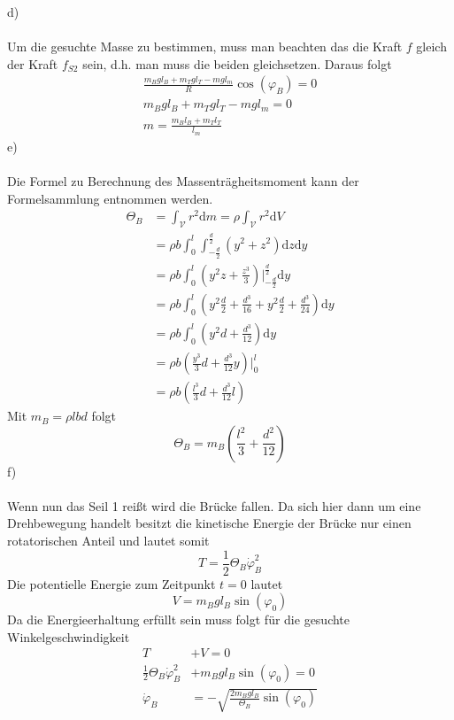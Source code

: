 d)\\ \\
Um die gesuchte Masse zu bestimmen, muss man beachten das die Kraft $f$ gleich der Kraft $f_{S2}$ sein, d.h. man muss die beiden gleichsetzen. Daraus folgt
\begin{align*}
	\frac{m_Bgl_B + m_Tgl_T - mgl_m}{R}\cos(\varphi_B) = 0 \\
	m_Bgl_B + m_Tgl_T - mgl_m = 0 \\
	m = \frac{m_Bl_B + m_Tl_T}{l_m}
\end{align*}
\newpage
\noindent
e)\\ \\
Die Formel zu Berechnung des Massenträgheitsmoment kann der Formelsammlung entnommen werden.
\begin{align*}
	\varTheta_B &= \int_{\mathcal{V}}r^2\text{d}m = \rho \int_{\mathcal{V}}r^2\text{d}V \\
	&= \rho b \int_{0}^{l}\int_{-\frac{d}{2}}^{\frac{d}{2}}(y^2 + z^2)\text{d}z\text{d}y \\
	&= \rho b \int_{0}^{l}\left(y^2z + \frac{z^3}{3}\right)\biggl|^{\frac{d}{2}}_{-\frac{d}{2}}\text{d}y \\
	&= \rho b \int_{0}^{l}\left(y^2\frac{d}{2} + \frac{d^3}{16} + y^2\frac{d}{2} + \frac{d^3}{24}\right)\text{d}y \\
	&= \rho b \int_{0}^{l}\left(y^2d + \frac{d^3}{12}\right)\text{d}y \\
	&= \rho b \left(\frac{y^3}{3}d + \frac{d^3}{12}y\right)\biggl|^{l}_0 \\
	&= \rho b \left(\frac{l^3}{3}d + \frac{d^3}{12}l\right)
\end{align*}
Mit $m_B = \rho lbd$ folgt
\[
	\varTheta_B = m_B\left(\frac{l^2}{3} + \frac{d^2}{12}\right)
\]
f)\\ \\
Wenn nun das Seil 1 reißt wird die Brücke fallen. Da sich hier dann um eine Drehbewegung handelt besitzt die kinetische Energie der Brücke nur einen rotatorischen Anteil und lautet somit
\[
	T = \frac{1}{2}\varTheta_B\dot{\varphi}^2_B
\]
Die potentielle Energie zum Zeitpunkt $t = 0$ lautet
\[
	V = m_B g l_B \sin(\varphi_0)
\]
Da die Energieerhaltung erfüllt sein muss folgt für die gesuchte Winkelgeschwindigkeit
\begin{align*}
	T &+ V = 0 \\
	\frac{1}{2}\varTheta_B\dot{\varphi}_B^2 &+ m_B g l_B \sin(\varphi_0) = 0 \\
	\dot{\varphi}_B &= - \sqrt{\frac{2m_Bgl_B}{\varTheta_B}\sin(\varphi_0)} 
\end{align*}